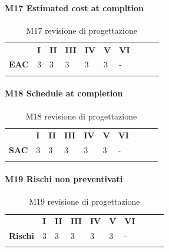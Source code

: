 \paragraph{M17 Estimated cost at compltion} \mbox{}
\begin{longtable}[H!] {						
		>{}p{50mm}  		
		>{}p{8mm}
		>{}p{8mm}		
		>{}p{8mm}		
		>{}p{8mm}		
		>{}p{8mm}		
		>{}p{8mm}
		>{}p{8mm}
		>{}p{8mm}
		>{}p{8mm}
	}
	\rowcolor{gray!50}
	\textbf{} & \textbf{I} & \textbf{II} & \textbf{III} & \textbf{IV} & \textbf{V} & \textbf{VI} \TBstrut \\ [2mm]
	\textbf{EAC} & 3 & 3 & 3 & 3 & 3 & - \TBstrut \\ [2mm]
	\rowcolor{white}
	\caption{M17 revisione di progettazione}
\end{longtable}
\paragraph{M18 Schedule at completion} \mbox{}
\begin{longtable}[H!] {						
		>{}p{50mm}  		
		>{}p{8mm}
		>{}p{8mm}		
		>{}p{8mm}		
		>{}p{8mm}		
		>{}p{8mm}		
		>{}p{8mm}
		>{}p{8mm}
		>{}p{8mm}
		>{}p{8mm}
	}
	\rowcolor{gray!50}
	\textbf{} & \textbf{I} & \textbf{II} & \textbf{III} & \textbf{IV} & \textbf{V} & \textbf{VI} \TBstrut \\ [2mm]
	\textbf{SAC} & 3 & 3 & 3 & 3 & 3 & - \TBstrut \\ [2mm]
	\rowcolor{white}
	\caption{M18 revisione di progettazione}
\end{longtable}
\paragraph{M19 Rischi non preventivati} \mbox{}
\begin{longtable}[H!] {						
		>{}p{50mm}  		
		>{}p{8mm}
		>{}p{8mm}		
		>{}p{8mm}		
		>{}p{8mm}		
		>{}p{8mm}		
		>{}p{8mm}
		>{}p{8mm}
		>{}p{8mm}
		>{}p{8mm}
	}
	\rowcolor{gray!50}
	\textbf{} & \textbf{I} & \textbf{II} & \textbf{III} & \textbf{IV} & \textbf{V} & \textbf{VI} \TBstrut \\ [2mm]
	\textbf{Rischi} & 3 & 3 & 3 & 3 & 3 & - \TBstrut \\ [2mm]
	\rowcolor{white}
	\caption{M19 revisione di progettazione}
\end{longtable}
